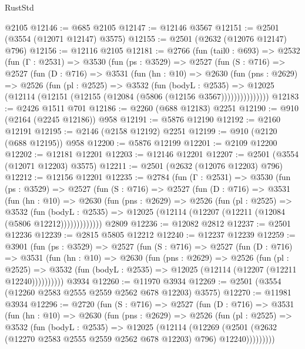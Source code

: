 \begin{lexlean}{RustStd}
\begin{coremodule}
    @2105
@12146 := @685 @2105
@12147 := @12146 @3567
@12151 := @2501 (@3554 (@12071 @12147) @3575)
@12155 := @2501 (@2632 (@12076 @12147) @796)
@12156 := @12116 @2105
@12181 := @2766
    (fun (tail0 : @693) =>
    @2532
      (fun (Γ : @2531) =>
      @3530
        (fun (ps : @3529) =>
        @2527
          (fun (S : @716) =>
          @2527
            (fun (D : @716) =>
            @3531
              (fun (hn : @10) =>
              @2630
                (fun (pns : @2629) =>
                @2526
                  (fun (pl : @2525) =>
                  @3532
                    (fun (bodyL : @2535) =>
                    @12025 (@12114 (@12151 (@12155 (@12084 (@5806 (@12156 @3567)))))))))))))))
@12183 := @2426 @1511 @701
@12186 := @2260 (@688 @12183) @2251
@12190 := @910 (@2164 (@2245 @12186)) @958
@12191 := @5876 @12190
@12192 := @2160 @12191
@12195 := @2146 (@2158 @12192) @2251
@12199 := @910 (@2120 (@688 @12195)) @958
@12200 := @5876 @12199
@12201 := @2109 @12200
@12202 := @12181 @12201
@12203 := @12146 @12201
@12207 := @2501 (@3554 (@12071 @12203) @3575)
@12211 := @2501 (@2632 (@12076 @12203) @796)
@12212 := @12156 @12201
@12235 := @2784
    (fun (Γ : @2531) =>
    @3530
      (fun (ps : @3529) =>
      @2527
        (fun (S : @716) =>
        @2527
          (fun (D : @716) =>
          @3531
            (fun (hn : @10) =>
            @2630
              (fun (pns : @2629) =>
              @2526
                (fun (pl : @2525) =>
                @3532
                  (fun (bodyL : @2535) =>
                  @12025 (@12114 (@12207 (@12211 (@12084 (@5806 @12212)))))))))))))
    @2809
@12236 := @12082 @2812
@12237 := @2501 @12236
@12239 := @2815 @5805 @12212
@12240 := @12237 @12239
@12259 := @3901
    (fun (ps : @3529) =>
    @2527
      (fun (S : @716) =>
      @2527
        (fun (D : @716) =>
        @3531
          (fun (hn : @10) =>
          @2630
            (fun (pns : @2629) =>
            @2526
              (fun (pl : @2525) =>
              @3532 (fun (bodyL : @2535) => @12025 (@12114 (@12207 (@12211 @12240))))))))))
    @3934
@12260 := @11970 @3934
@12269 := @2501 (@3554 (@12260 @2583 @2555 @2559 @2562 @678 @12203) @3575)
@12270 := @11981 @3934
@12296 := @2720
    (fun (S : @716) =>
    @2527
      (fun (D : @716) =>
      @3531
        (fun (hn : @10) =>
        @2630
          (fun (pns : @2629) =>
          @2526
            (fun (pl : @2525) =>
            @3532
              (fun (bodyL : @2535) =>
              @12025
                (@12114
                  (@12269
                    (@2501 (@2632 (@12270 @2583 @2555 @2559 @2562 @678 @12203) @796) @12240)))))))))

\end{coremodule}
\end{lexlean}
